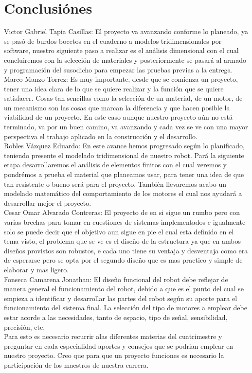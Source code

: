 \documentclass[12pt,a4paper]{report}
\begin{document}
  
\section{Conclusiónes}
Victor Gabriel Tapia Casillas: El proyecto va avanzando conforme lo planeado, ya se pasó de burdos bocetos en el cuaderno a modelos tridimensionales por software, nuestro siguiente paso a realizar es el análisis dimensional con el cual concluiremos con la selección de materiales y posteriormente se pasará al armado y programación del susodicho para empezar las pruebas previas a la entrega.\\

Marco Manzo Torrez: Es muy importante, desde que se comienza un proyecto, tener una idea clara de lo que se quiere realizar y la función que se quiere satisfacer. Cosas tan sencillas como la selección de un material, de un motor, de un mecanismo son las cosas que marcan la diferencia y que hacen posible la viabilidad de un proyecto. En este caso aunque nuestro proyecto aún no está terminado, va por un buen camino, va avanzando y cada vez se ve con una mayor perspectiva el trabajo aplicado en la construcción y el desarrollo.\\

Robles Vázquez Eduardo: En este avance hemos progresado según lo planificado, teniendo presente el modelado tridimensional de nuestro robot. Pará la siguiente etapa desarrollaremos el análisis de elementos finitos con el cual veremos y pondrémos a prueba el material que planeamos usar, para tener una idea de que tan resistente o bueno será para el proyecto. También llevaremos acabo un modelado matemático del comportamiento de los motores el cual nos ayudará a desarrollar mejor el proyecto.\\

Cesar Omar Alvarado Contreras: El proyecto de en si sigue un rumbo pero con varias brechas para tomar en cuestiones de sistemas implementados e igualmente solo se puede decir que el objetivo aun sigue en pie el cual esta definido en el tema visto, el problema que se ve es el diseño de la estructura ya que en ambos diseños provistos son robustos, e cada uno tiene su ventaja y desventaja como era de esperarse pero se opta por el segundo diseño que es mas practico y simple de elaborar y mas ligero.\\

Fonseca Camarena Jonathan: El diseño funcional del robot debe reflejar de manera general el funcionamiento del robot, debido a que es el punto del cual se empieza a identificar y desarrollar las partes del robot según su aporte para el funcionamiento del sistema final.
La selección del tipo de motores a emplear debe estar acorde a las necesidades, tanto de espacio, tipo de señal, sensibilidad, precisión, etc.\\
Para esto es necesario recurrir alas diferentes materias del cuatrimestre y preguntar en cada especialidad aportes y consejos que se podrian emplear en nuestro proyecto. Creo que para que un proyecto funciones es necesario la participación de los maestros de nuestra carrera.
\end{document}
